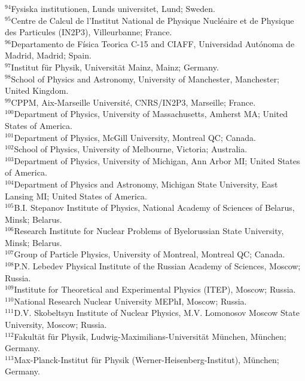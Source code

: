\begin{flushleft}
$^{94}$Fysiska institutionen, Lunds universitet, Lund; Sweden.\\
$^{95}$Centre de Calcul de l'Institut National de Physique Nucl\'eaire et de Physique des Particules (IN2P3), Villeurbanne; France.\\
$^{96}$Departamento de F\'isica Teorica C-15 and CIAFF, Universidad Aut\'onoma de Madrid, Madrid; Spain.\\
$^{97}$Institut f\"{u}r Physik, Universit\"{a}t Mainz, Mainz; Germany.\\
$^{98}$School of Physics and Astronomy, University of Manchester, Manchester; United Kingdom.\\
$^{99}$CPPM, Aix-Marseille Universit\'e, CNRS/IN2P3, Marseille; France.\\
$^{100}$Department of Physics, University of Massachusetts, Amherst MA; United States of America.\\
$^{101}$Department of Physics, McGill University, Montreal QC; Canada.\\
$^{102}$School of Physics, University of Melbourne, Victoria; Australia.\\
$^{103}$Department of Physics, University of Michigan, Ann Arbor MI; United States of America.\\
$^{104}$Department of Physics and Astronomy, Michigan State University, East Lansing MI; United States of America.\\
$^{105}$B.I. Stepanov Institute of Physics, National Academy of Sciences of Belarus, Minsk; Belarus.\\
$^{106}$Research Institute for Nuclear Problems of Byelorussian State University, Minsk; Belarus.\\
$^{107}$Group of Particle Physics, University of Montreal, Montreal QC; Canada.\\
$^{108}$P.N. Lebedev Physical Institute of the Russian Academy of Sciences, Moscow; Russia.\\
$^{109}$Institute for Theoretical and Experimental Physics (ITEP), Moscow; Russia.\\
$^{110}$National Research Nuclear University MEPhI, Moscow; Russia.\\
$^{111}$D.V. Skobeltsyn Institute of Nuclear Physics, M.V. Lomonosov Moscow State University, Moscow; Russia.\\
$^{112}$Fakult\"at f\"ur Physik, Ludwig-Maximilians-Universit\"at M\"unchen, M\"unchen; Germany.\\
$^{113}$Max-Planck-Institut f\"ur Physik (Werner-Heisenberg-Institut), M\"unchen; Germany.\\

\end{flushleft}
